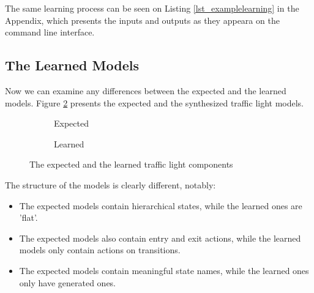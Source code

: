 \bigskip
The same learning process can be seen on Listing \ref{lst_examplelearning} in the Appendix, which presents the inputs and outputs as they appeara on the command line interface.

\subsection{The Learned Models} \label{subs_casestudyresults}

Now we can examine any differences between the expected and the learned models. Figure \ref{fig_casestudy_trafficlightdiff} presents the expected and the synthesized traffic light models.

\begin{figure}[!ht] 
	\centering
	\begin{subfigure}[b]{0.9\textwidth}
		\centering
		\caption{Expected}
	\end{subfigure}
	\hfill
	\begin{subfigure}[b]{0.9\textwidth}
		\centering
		\caption{Learned}	
		\label{fig_casestudy_trafficlightlearned}
	\end{subfigure}
	\caption{The expected and the learned traffic light components}
	\label{fig_casestudy_trafficlightdiff}
\end{figure}

The structure of the models is clearly different, notably:
\begin{itemize}
	\item The expected models contain hierarchical states, while the learned ones are 'flat'.
	\item The expected models also contain entry and exit actions, while the learned models only contain actions on transitions. 
	\item The expected models contain meaningful state names, while the learned ones only have generated ones.
\end{itemize}

